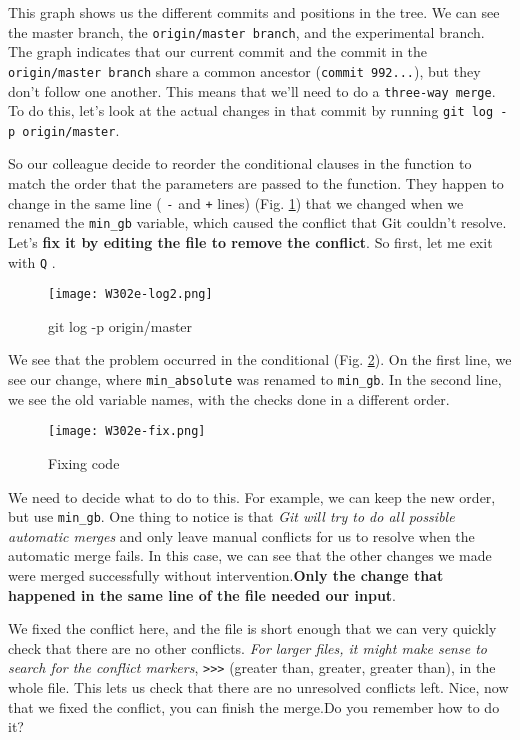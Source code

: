 This graph shows us the different commits and positions in the tree. We can see the master branch, the \verb|origin/master branch|, and the experimental branch. The graph indicates that our current commit and the commit in the \verb|origin/master branch| share a common ancestor (\verb|commit 992...|), but they don't follow one another.
This means that we'll need to do a \verb|three-way merge|. To do this, let's look at the actual changes in that commit by running \verb|git log -p origin/master|.

So our colleague decide to reorder the conditional clauses in the function to match the order that the parameters are passed to the function. 
They happen to change in the same line ( \verb|-| and \verb|+| lines) (Fig. \ref{W302e-log2}) that we changed when we renamed the \verb|min_gb| variable, which caused the conflict that Git couldn't resolve. Let's \textbf{fix it by editing the file to remove the conflict}. So first, let me exit with \verb|Q| .

\begin{figure} 
	\caption{git log -p origin/master}
	\centering
	\texttt{[image: W302e-log2.png]}
	\label{W302e-log2}
\end{figure}

We see that the problem occurred in the conditional (Fig. \ref{W302e-fix}). On the first line, we see our change, where \verb|min_absolute| was renamed to \verb|min_gb|. In the second line, we see the old variable names, with the checks done in a different order.

\begin{figure} 
	\caption{Fixing code}
	\centering
	\texttt{[image: W302e-fix.png]}
	\label{W302e-fix}
\end{figure}

We need to decide what to do to this. For example, we can keep the new order, but use \verb|min_gb|. One thing to notice is that \textit{Git will try to do all possible automatic merges} and only leave manual conflicts for us to resolve when the automatic merge fails.
In this case, we can see that the other changes we made were merged successfully without intervention.\textbf{Only the change that happened in the same line of the file needed our input}. 

We fixed the conflict here, and the file is short enough that we can very quickly check that there are no other conflicts.\textit{ For larger files, it might make sense to search for the conflict markers}, \verb|>>>| (greater than, greater, greater than), in the whole file. This lets us check that there are no unresolved conflicts left. Nice, now that we fixed the conflict, you can finish the merge.Do you remember how to do it?

